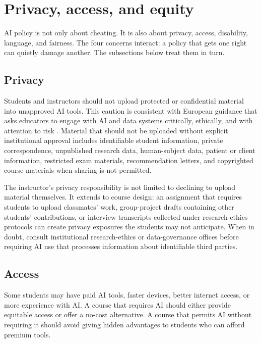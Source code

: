 \documentclass{SIAMbook2023}
\begin{document}
\section{Privacy, access, and equity}
\label{i:sec:privacy-equity}%

AI policy is not only about cheating. It is also about privacy, access, disability, language, and fairness. The four concerns interact: a policy that gets one right can quietly damage another. The subsections below treat them in turn.

\subsection{Privacy}
\label{i:subsec:privacy}

Students and instructors should not upload protected or confidential material into unapproved AI tools. This caution is consistent with European guidance that asks educators to engage with AI and data systems critically, ethically, and with attention to risk \citep{europeancommission2022ethical}. Material that should not be uploaded without explicit institutional approval includes identifiable student information, private correspondence, unpublished research data, human-subject data, patient or client information, restricted exam materials, recommendation letters, and copyrighted course materials when sharing is not permitted.

The instructor's privacy responsibility is not limited to declining to upload material themselves. It extends to course design: an assignment that requires students to upload classmates' work, group-project drafts containing other students' contributions, or interview transcripts collected under research-ethics protocols can create privacy exposures the students may not anticipate. When in doubt, consult institutional research-ethics or data-governance offices before requiring AI use that processes information about identifiable third parties.

\subsection{Access}
\label{i:subsec:access}

Some students may have paid AI tools, faster devices, better internet access, or more experience with AI. A course that requires AI should either provide equitable access or offer a no-cost alternative. A course that permits AI without requiring it should avoid giving hidden advantages to students who can afford premium tools.
\end{document}
